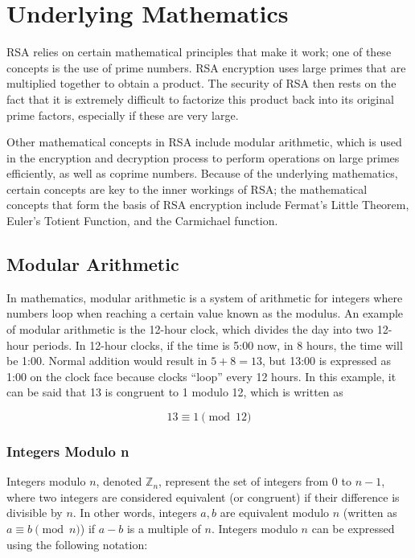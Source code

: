 \section{Underlying Mathematics}\label{sec:section2}
RSA relies on certain mathematical principles that make it work; one of these concepts is the use of prime numbers. RSA encryption uses large primes that are multiplied together to obtain a product. The security of RSA then rests on the fact that it is extremely difficult to factorize this product back into its original prime factors, especially if these are very large. 

Other mathematical concepts in RSA include modular arithmetic, which is used in the encryption and decryption process to perform operations on large primes efficiently, as well as coprime numbers. Because of the underlying mathematics, certain concepts are key to the inner workings of RSA; the mathematical concepts that form the basis of RSA encryption include Fermat's Little Theorem, Euler's Totient Function, and the Carmichael function. 

\subsection{Modular Arithmetic}\label{sec:section2.1}

In mathematics, modular arithmetic is a system of arithmetic for integers where numbers loop when reaching a certain value known as the modulus. An example of modular arithmetic is the 12-hour clock, which divides the day into two 12-hour periods. In 12-hour clocks, if the time is 5:00 now, in 8 hours, the time will be 1:00. Normal addition would result in $5 + 8 = 13$, but 13:00 is expressed as 1:00 on the clock face because clocks “loop” every 12 hours. In this example, it can be said that 13 is congruent to 1 modulo 12, which is written as

$$
13 \equiv 1 \pmod{12}
$$

\subsubsection{Integers Modulo n}\label{sec:section2.1.1}

Integers modulo $n$, denoted $\mathbb{Z}_n$, represent the set of integers from $0$ to $n-1$, where two integers are considered equivalent (or congruent) if their difference is divisible by $n$. In other words, integers $a, b$ are equivalent modulo $n$ (written as $a \equiv b \pmod{n}$) if $a - b$ is a multiple of $n$. Integers modulo $n$ can be expressed using the following notation:

